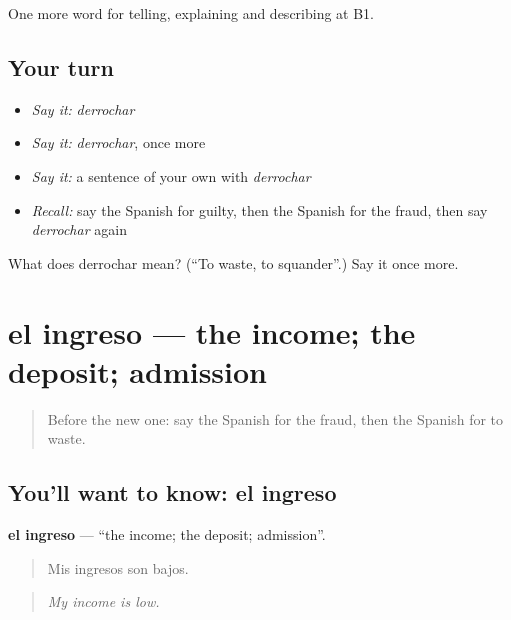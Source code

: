 \begin{grammarlens}[title={What you've built}]
One more word for telling, explaining and describing at B1.
\end{grammarlens}

\subsection*{Your turn}
\begin{itemize}
\raggedright
  \item \emph{Say it:} \emph{derrochar}
  \item \emph{Say it:} \emph{derrochar}, once more
  \item \emph{Say it:} a sentence of your own with \emph{derrochar}
  \item \emph{Recall:} say the Spanish for guilty, then the Spanish for the fraud, then say \emph{derrochar} again
\end{itemize}

\begin{tcolorbox}[breakable,colback=teal!4,colframe=teal!35!black,title={Before you move on}]
What does derrochar mean? (\textquotedblleft{}To waste, to squander\textquotedblright{}.) Say it once more.
\end{tcolorbox}
\section[el ingreso]{el ingreso — the income; the deposit; admission}

\label{lesson:ES-C627-ingreso}



\begin{quote}
Before the new one: say the Spanish for the fraud, then the Spanish for to waste.
\end{quote}

\subsection*{You'll want to know: el ingreso}
\textbf{el ingreso} — \textquotedblleft{}the income; the deposit; admission\textquotedblright{}.

\begin{quote}
Mis ingresos son bajos.
\end{quote}

\begin{quote}
\emph{My income is low.}
\end{quote}

